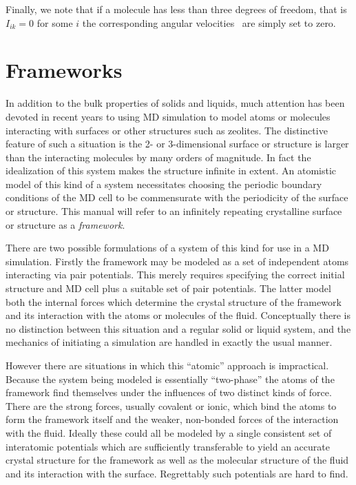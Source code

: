 Finally, we note that if a molecule has less than three degrees of
freedom, that is $I_{ik}=0$ for some $i$ the corresponding angular
velocities \etc\ are simply set to zero.

\section{Frameworks}%
\label{sec:frameworks}
In addition to the bulk properties of solids and liquids, much
attention has been devoted in recent years to using MD simulation to
model atoms or molecules interacting with surfaces or other structures
such as zeolites.  The distinctive feature of such a situation is the
2- or 3-dimensional surface or structure is larger than the
interacting molecules by many orders of magnitude.  In fact the
idealization of this system makes the structure infinite in extent.
An atomistic model of this kind of a system necessitates choosing the
periodic boundary conditions of the MD cell to be commensurate with
the periodicity of the surface or structure.  This manual will refer
to an infinitely repeating crystalline surface or structure as a {\em
framework}.

There are two possible formulations of a system of this kind for use
in a MD simulation.  Firstly the framework may be modeled as a set of
independent atoms interacting via pair potentials.  This merely
requires specifying the correct initial structure and MD cell plus a
suitable set of pair potentials. The latter model both the internal
forces which determine the crystal structure of the framework and its
interaction with the atoms or molecules of the fluid.  Conceptually
there is no distinction between this situation and a regular solid or
liquid system, and the mechanics of initiating a simulation are
handled in exactly the usual manner.

However there are situations in which this ``atomic'' approach is
impractical.  Because the system being modeled is essentially
``two-phase'' the atoms of the framework find themselves under the
influences of two distinct kinds of force.  There are the strong
forces, usually covalent or ionic, which bind the atoms to form the
framework itself and the weaker, non-bonded forces of the interaction
with the fluid.  Ideally these could all be modeled by a single
consistent set of interatomic potentials which are sufficiently
transferable to yield an accurate crystal structure for the framework
as well as the molecular structure of the fluid and its interaction
with the surface.  Regrettably such potentials are hard to find.

